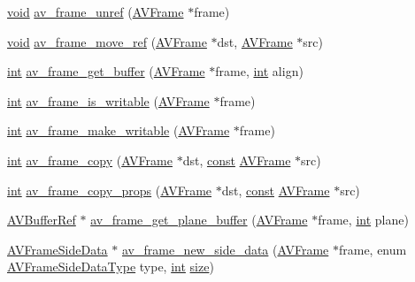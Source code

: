 \begin{DoxyCompactItemize}
\item 
\hyperlink{sound_8c_ae35f5844602719cf66324f4de2a658b3}{void} \hyperlink{group__lavu__frame_ga0a2b687f9c1c5ed0089b01fd61227108}{av\+\_\+frame\+\_\+unref} (\hyperlink{struct_a_v_frame}{A\+V\+Frame} $\ast$frame)
\item 
\hyperlink{sound_8c_ae35f5844602719cf66324f4de2a658b3}{void} \hyperlink{group__lavu__frame_ga709e62bc2917ffd84c5c0f4e1dfc48f7}{av\+\_\+frame\+\_\+move\+\_\+ref} (\hyperlink{struct_a_v_frame}{A\+V\+Frame} $\ast$dst, \hyperlink{struct_a_v_frame}{A\+V\+Frame} $\ast$src)
\item 
\hyperlink{xmltok_8h_a5a0d4a5641ce434f1d23533f2b2e6653}{int} \hyperlink{group__lavu__frame_ga6b1acbfa82c79bf7fd78d868572f0ceb}{av\+\_\+frame\+\_\+get\+\_\+buffer} (\hyperlink{struct_a_v_frame}{A\+V\+Frame} $\ast$frame, \hyperlink{xmltok_8h_a5a0d4a5641ce434f1d23533f2b2e6653}{int} align)
\item 
\hyperlink{xmltok_8h_a5a0d4a5641ce434f1d23533f2b2e6653}{int} \hyperlink{group__lavu__frame_ga3ba755bada5c3c8883361ef43fb5fb7a}{av\+\_\+frame\+\_\+is\+\_\+writable} (\hyperlink{struct_a_v_frame}{A\+V\+Frame} $\ast$frame)
\item 
\hyperlink{xmltok_8h_a5a0d4a5641ce434f1d23533f2b2e6653}{int} \hyperlink{group__lavu__frame_gadd5417c06f5a6b419b0dbd8f0ff363fd}{av\+\_\+frame\+\_\+make\+\_\+writable} (\hyperlink{struct_a_v_frame}{A\+V\+Frame} $\ast$frame)
\item 
\hyperlink{xmltok_8h_a5a0d4a5641ce434f1d23533f2b2e6653}{int} \hyperlink{group__lavu__frame_gaec4e92f6e1e75ffaf76e07586fb0c9ed}{av\+\_\+frame\+\_\+copy} (\hyperlink{struct_a_v_frame}{A\+V\+Frame} $\ast$dst, \hyperlink{getopt1_8c_a2c212835823e3c54a8ab6d95c652660e}{const} \hyperlink{struct_a_v_frame}{A\+V\+Frame} $\ast$src)
\item 
\hyperlink{xmltok_8h_a5a0d4a5641ce434f1d23533f2b2e6653}{int} \hyperlink{group__lavu__frame_gab9b275b114ace0db95c5796bc71f3012}{av\+\_\+frame\+\_\+copy\+\_\+props} (\hyperlink{struct_a_v_frame}{A\+V\+Frame} $\ast$dst, \hyperlink{getopt1_8c_a2c212835823e3c54a8ab6d95c652660e}{const} \hyperlink{struct_a_v_frame}{A\+V\+Frame} $\ast$src)
\item 
\hyperlink{struct_a_v_buffer_ref}{A\+V\+Buffer\+Ref} $\ast$ \hyperlink{group__lavu__frame_ga7fb7f99dabe10fa5c7c078f4f5f173c5}{av\+\_\+frame\+\_\+get\+\_\+plane\+\_\+buffer} (\hyperlink{struct_a_v_frame}{A\+V\+Frame} $\ast$frame, \hyperlink{xmltok_8h_a5a0d4a5641ce434f1d23533f2b2e6653}{int} plane)
\item 
\hyperlink{struct_a_v_frame_side_data}{A\+V\+Frame\+Side\+Data} $\ast$ \hyperlink{group__lavu__frame_gab4caf9361b00f9b2ab57c222dce3fec4}{av\+\_\+frame\+\_\+new\+\_\+side\+\_\+data} (\hyperlink{struct_a_v_frame}{A\+V\+Frame} $\ast$frame, enum \hyperlink{group__lavu__frame_gae01fa7e427274293aacdf2adc17076bc}{A\+V\+Frame\+Side\+Data\+Type} type, \hyperlink{xmltok_8h_a5a0d4a5641ce434f1d23533f2b2e6653}{int} \hyperlink{group__lavu__mem_ga854352f53b148adc24983a58a1866d66}{size})

\end{DoxyCompactItemize}

